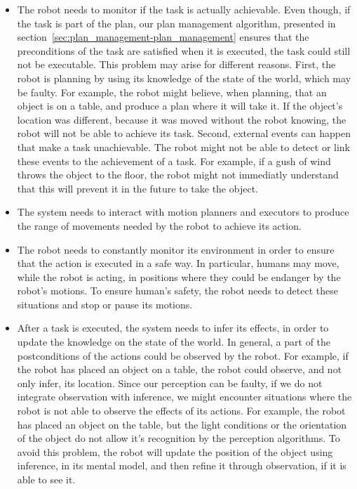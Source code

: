 \begin{itemize}
\item The robot needs to monitor if the task is actually achievable. Even though, if the task is part of the plan, our plan management algorithm, presented in section~\ref{sec:plan_management-plan_management} ensures that the preconditions of the task are satisfied when it is executed, the task could still not be executable. This problem may arise for different reasons. First, the robot is planning by using its knowledge of the state of the world, which may be faulty. For example, the robot might believe, when planning, that an object is on a table, and produce a plan where it will take it. If the object's location was different, because it was moved without the robot knowing, the robot will not be able to achieve its task. Second, external events can happen that make a task unachievable. The robot might not be able to detect or link these events to the achievement of a task. For example, if a gush of wind throws the object to the floor, the robot might not immediatly understand that this will prevent it in the future to take the object.
\item The system needs to interact with motion planners and executors to produce the range of movements needed by the robot to achieve its action.
\item The robot needs to constantly monitor its environment in order to ensure that the action is executed in a safe way. In particular, humans may move, while the robot is acting, in positions where they could be endanger by the robot's motions. To ensure human's safety, the robot needs to detect these situations and stop or pause its motions.
\item After a task is executed, the system needs to infer its effects, in order to update the knowledge on the state of the world. In general, a part of the postconditions of the actions could be observed by the robot. For example, if the robot has placed an object on a table, the robot could observe, and not only infer, its location. Since our perception can be faulty, if we do not integrate observation with inference, we might encounter situations where the robot is not able to observe the effects of its actions. For example, the robot has placed an object on the table, but the light conditions or the orientation of the object do not allow it's recognition by the perception algorithms. To avoid this problem, the robot will update the position of the object using inference, in its mental model, and then refine it through observation, if it is able to see it.
\end{itemize}

